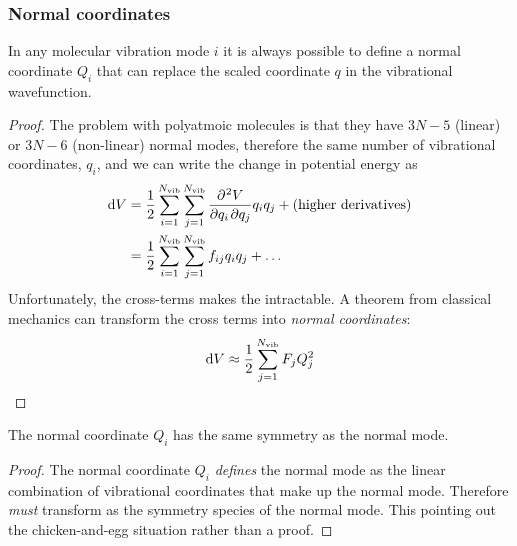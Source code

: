 \subsubsection{Normal coordinates}
\begin{thrm}
\label{sym_of_vibfun}
In any molecular vibration mode $i$ it is always possible to define a normal coordinate $Q_i$ that can replace the scaled coordinate $q$ in the vibrational wavefunction.
\end{thrm}
\begin{proof}
	The problem with polyatmoic molecules is that they have $3N-5$ (linear) or $3N-6$ (non-linear) normal modes, therefore the same number of vibrational coordinates, $q_i$, and we can write the change in potential energy as
\begin{equation}
\begin{aligned}
	\dif V&=\frac{1}{2}\sum_{i=1}^{N_{\mathrm{vib}}}\sum_{j=1}^{N_{\mathrm{vib}}}\diffp{V}{q_i,q_j}q_iq_j+(\text{higher derivatives})\\
	&=\frac{1}{2}\sum_{i=1}^{N_{\mathrm{vib}}}\sum_{j=1}^{N_{\mathrm{vib}}}f_{ij}q_iq_j+\dots
\end{aligned}
\end{equation}
Unfortunately, the cross-terms makes the \sch intractable. A theorem from classical mechanics can transform the cross terms into \emph{normal coordinates}:
\begin{equation}
	\dif V\approx\frac{1}{2}\sum_{j=1}^{N_{\mathrm{vib}}}F_jQ_j^2
\end{equation}
\end{proof}
\begin{prt}
The normal coordinate $Q_i$ has the same symmetry as the normal mode.
\end{prt}
\begin{proof}
	The normal coordinate $Q_i$ \emph{defines} the normal mode as the linear combination of vibrational coordinates that make up the normal mode. Therefore \emph{must} transform as the symmetry species of the normal mode. This pointing out the chicken-and-egg situation rather than a proof.
\end{proof}
